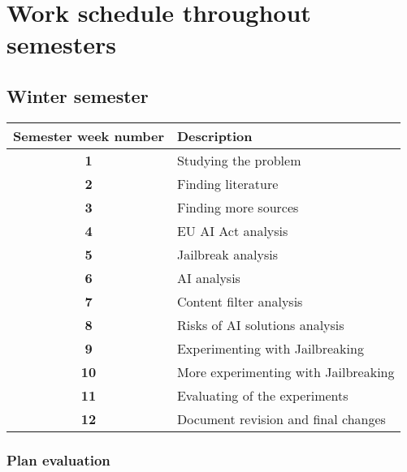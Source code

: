 \setcounter{figure}{0}
\setcounter{table}{0}
\setcounter{section}{0}
\setcounter{listing}{0}
\renewcommand{\thepage}{A-\arabic{page}}
\setcounter{page}{1}

\chapter{Work schedule throughout semesters \label{cha:work_schedule} }

\section*{Winter semester}

{
    \renewcommand{\arraystretch}{1.2}
    \begin{table}[htpb]
        \centering
        \begin{tabular}{|c|l|}
        \hline
        \cellcolor[gray]{0.8}\textbf{Semester week number} & \cellcolor[gray]{0.8}\textbf{Description} \\ \hline
    
        \textbf{1} & Studying the problem \\ \hline
        \textbf{2} & Finding literature \\ \hline
        \textbf{3} & Finding more sources \\ \hline
        \textbf{4} & EU AI Act analysis \\ \hline
        \textbf{5} & Jailbreak analysis \\ \hline
        \textbf{6} & AI analysis \\ \hline
        \textbf{7} & Content filter analysis \\ \hline
        \textbf{8} & Risks of AI solutions analysis \\ \hline
        \textbf{9} & Experimenting with Jailbreaking \\ \hline
        \textbf{10} & More experimenting with Jailbreaking \\ \hline
        \textbf{11} & Evaluating of the experiments \\ \hline
        \textbf{12} & Document revision and final changes \\ \hline
        \end{tabular}
    \end{table}
}

\subsection*{Plan evaluation}

